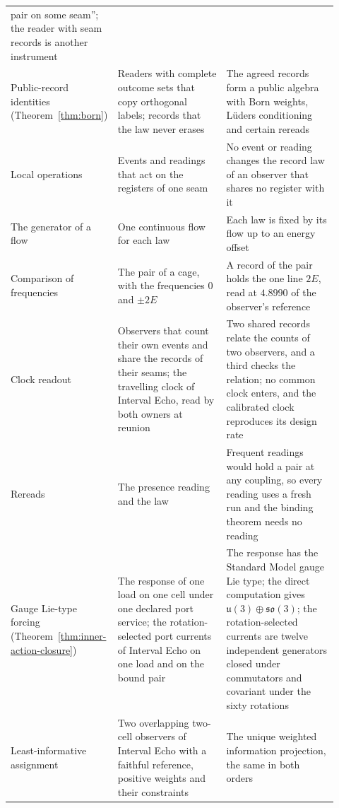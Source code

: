 \documentclass[11pt]{article}
\theoremstyle{definition}
\theoremstyle{remark}
\begin{document}
{\begin{longtable}{@{}L{0.25\linewidth}L{0.33\linewidth}L{0.34\linewidth}@{}}
pair on some seam''; the reader with seam records is another instrument\\
Public-record identities (Theorem~\ref{thm:born}) & Readers with complete
outcome sets that copy orthogonal labels; records that the law never
erases & The agreed records form a public algebra with Born weights,
L\"uders conditioning and certain rereads\\
Local operations & Events and readings that act on the registers of one
seam & No event or reading changes the record law of an observer that
shares no register with it\\
The generator of a flow & One continuous flow for each law & Each law is
fixed by its flow up to an energy offset\\
Comparison of frequencies & The pair of a cage, with the frequencies $0$
and $\pm2E$ & A record of the pair holds the one line $2E$, read at
$4.8990$ of the observer's reference\\
Clock readout & Observers that count their own events and share the
records of their seams; the travelling clock of Interval Echo, read by both
owners at reunion & Two shared records relate the counts of two observers,
and a third checks the relation; no common clock enters, and the calibrated clock reproduces its design rate\\
Rereads & The presence reading and the law & Frequent readings would hold a
pair at any coupling, so every reading uses a fresh run and the binding
theorem needs no reading\\
Gauge Lie-type forcing (Theorem~\ref{thm:inner-action-closure}) & The
response of one load on one cell under one declared port service; the
rotation-selected port currents of Interval Echo on one load and on the
bound pair & The response has the Standard Model gauge Lie type; the direct
computation gives $\mathfrak u(3)\oplus\mathfrak{so}(3)$; the
rotation-selected currents are twelve independent generators closed under
commutators and covariant under the sixty rotations\\
Least-informative assignment & Two overlapping two-cell observers of
Interval Echo with a faithful reference, positive weights and their
constraints & The unique weighted information projection, the same in both
orders\\
\bottomrule
\end{longtable}
}
\end{document}
